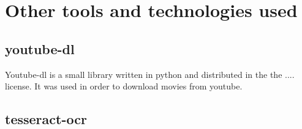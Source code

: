 \section{Other tools and technologies used}
\label{sec:other tools}

\subsection{youtube-dl}
Youtube-dl is a small library written in python and distributed in the the .... license. 
It was used in order to download movies from youtube.


\subsection{tesseract-ocr}

